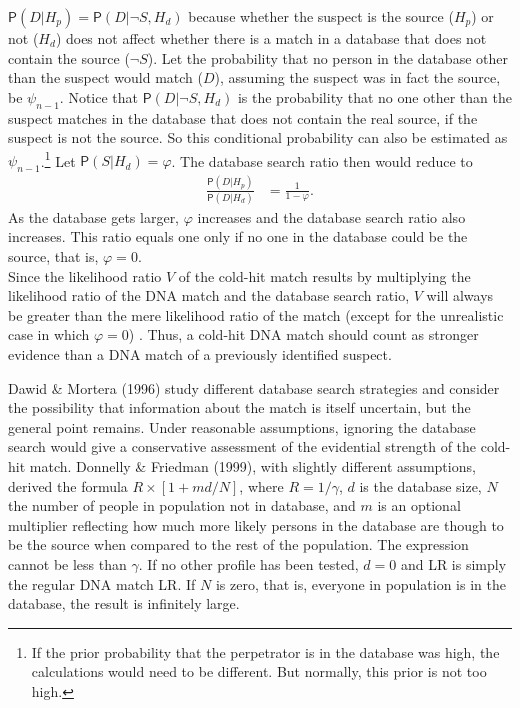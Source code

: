 \documentclass[
  10pt,
  dvipsnames,enabledeprecatedfontcommands]{scrartcl}
\newcommand{\pr}[1]{\mathsf{P}(#1)}
\begin{document}
\(\pr{D\vert H_p}=\pr{D\vert \neg S, H_d}\) because whether the suspect
is the source (\(H_p\)) or not (\(H_d\)) does not affect whether there
is a match in a database that does not contain the source (\(\neg S\)).
Let the probability that no person in the database other than the
suspect would match (\(D\)), assuming the suspect was in fact the
source, be \(\psi_{n-1}\). Notice that \(\pr{D\vert \neg S, H_d}\) is
the probability that no one other than the suspect matches in the
database that does not contain the real source, if the suspect is not
the source. So this conditional probability can also be estimated as
\(\psi_{n-1}\).\footnote{If the prior probability that the perpetrator is in the database was high, the calculations would need to be different. But normally, this prior is not too high.}
Let \(\pr{S | H_d}=\varphi\). The database search ratio then would
reduce to \vspace{-2mm} \begin{align*}
\frac{\pr{D\vert H_p}}{\pr{D\vert H_d}} & = \frac{1}{1-\varphi}.
\end{align*} \noindent As the database gets larger, \(\varphi\)
increases and the database search ratio also increases. This ratio
equals one only if no one in the database could be the source, that is,
\(\varphi=0\).\\
Since the likelihood ratio \(V\) of the cold-hit match results by
multiplying the likelihood ratio of the DNA match and the database
search ratio, \(V\) will always be greater than the mere likelihood
ratio of the match (except for the unrealistic case in which
\(\varphi=0\)) . Thus, a cold-hit DNA match should count as stronger
evidence than a DNA match of a previously identified suspect.

Dawid \& Mortera (1996) study different database search strategies and
consider the possibility that information about the match is itself
uncertain, but the general point remains. Under reasonable assumptions,
ignoring the database search would give a conservative assessment of the
evidential strength of the cold-hit match. Donnelly \& Friedman (1999),
with slightly different assumptions, derived the formula
\(R \times [1+md/N]\), where \(R = 1/\gamma\), \(d\) is the database
size, \(N\) the number of people in population not in database, and
\(m\) is an optional multiplier reflecting how much more likely persons
in the database are though to be the source when compared to the rest of
the population. The expression cannot be less than \(\gamma\). If no
other profile has been tested, \(d=0\) and LR is simply the regular DNA
match LR. If \(N\) is zero, that is, everyone in population is in the
database, the result is infinitely large.
\end{document}

